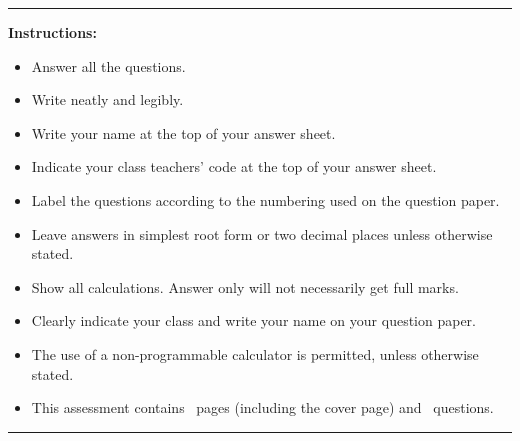 \documentclass[12pt]{exam}
\begin{document}
\smallskip

\vspace{0.5cm}

\rule[1ex]{\textwidth}{.1pt}

\medskip

\quad \textbf{Instructions:}

\begin{itemize}
\item Answer all the questions.
\item Write neatly and legibly.
\item Write your name at the top of your answer sheet.
\item Indicate your class teachers' code at the top of your answer sheet.
\item Label the questions according to the numbering used on the question paper.
\item Leave answers in simplest root form or two decimal places unless otherwise stated.
\item Show all calculations. Answer only will not necessarily get full marks.
\item Clearly indicate your class and write your name on your question paper.
\item The use of a non-programmable calculator is permitted, unless otherwise stated.
\item This assessment contains \numpages\ pages (including the cover page) and \numquestions\ questions.
\end{itemize}

\rule[1ex]{\textwidth}{.1pt}

\hfill

\vspace{0.5cm}


\newpage %

%
%
\end{document}
